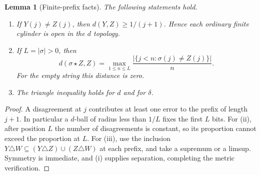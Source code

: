 \documentclass[11pt,a4paper]{article}
\newcommand{\patch}{\mathbin\star}
\newtheorem{lemma}[theorem]{Lemma}
\theoremstyle{definition}\newtheorem{definition}[theorem]{Definition}
\theoremstyle{remark}\newtheorem{remark}[theorem]{Remark}
\begin{document}
\begin{lemma}[Finite-prefix facts]\label{lem:prefix}
The following statements hold.
\begin{enumerate}[label=(\roman*)]
\item If $Y(j)\ne Z(j)$, then $d(Y,Z)\ge1/(j+1)$. Hence each ordinary finite
cylinder is open in the $d$ topology.
\item If $L=|\sigma|>0$, then
\begin{equation}\label{eq:patchidentity}
 d(\sigma\patch Z,Z)
 =\max_{1\le n\le L}\frac{|\{j<n:\sigma(j)\ne Z(j)\}|}{n}.
\end{equation}
For the empty string this distance is zero.
\item The triangle inequality holds for $d$ and for $\delta$.
\end{enumerate}
\end{lemma}
\begin{proof}
A disagreement at $j$ contributes at least one error to the prefix of length
$j+1$. In particular a $d$-ball of radius less than $1/L$ fixes the first $L$
bits. For (ii), after position $L$ the number of disagreements is constant,
so its proportion cannot exceed the proportion at $L$. For (iii), use the
inclusion
$Y\triangle W\subseteq(Y\triangle Z)\cup(Z\triangle W)$ at each prefix,
and take a supremum or a limsup. Symmetry is immediate, and (i) supplies
separation, completing the metric verification.
\end{proof}
\end{document}
